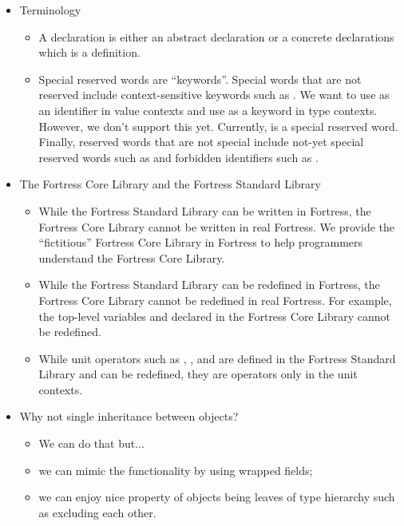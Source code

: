 \begin{itemize}
\item Terminology
  \begin{itemize}
  \item A declaration is either an abstract declaration or a concrete
  declarations which is a definition.
  \item Special reserved words are ``keywords''.  Special words that are
  not reserved include context-sensitive keywords such as .  We
  want to use  as an identifier in value contexts and use
   as a keyword in type contexts.  However, we don't support this
  yet.  Currently,  is a special reserved word.  Finally,
  reserved words that are not special include not-yet special reserved
  words such as  and forbidden identifiers such as
  .
  \end{itemize}

\item The Fortress Core Library and the Fortress Standard Library
  \begin{itemize}
  \item While the Fortress Standard Library can be written in Fortress, the
  Fortress Core Library cannot be written in real Fortress.  We provide the
  ``fictitious'' Fortress Core Library in Fortress to help programmers
  understand the Fortress Core Library.
  \item While the Fortress Standard Library can be redefined in Fortress, the
  Fortress Core Library cannot be redefined in real Fortress.
  For example, the top-level variables  and  declared in
  the Fortress Core Library cannot be redefined.
  \item While unit operators such as , , and
   are defined in the Fortress Standard Library and can be
  redefined, they are operators only in the unit contexts.
  \end{itemize}

\item Why not single inheritance between objects?
  \begin{itemize}
  \item We can do that but...
  \item we can mimic the functionality by using wrapped fields;
  \item we can enjoy nice property of objects being leaves of type
  hierarchy such as excluding each other.
  \end{itemize}

\end{itemize}
